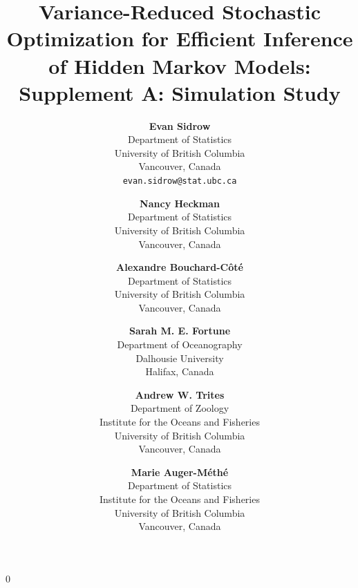 \documentclass[12pt]{article}
\newcommand{\blind}{0}
\begin{document}
\raggedbottom
%

\def\spacingset#1{\renewcommand{\baselinestretch}%
{#1}\small\normalsize} \spacingset{1}


\blind
{
    \title{Variance-Reduced Stochastic Optimization for Efficient Inference of Hidden Markov Models: Supplement A: Simulation Study}
    
    \author{
      \textbf{Evan Sidrow} \\
      Department of Statistics \\
      University of British Columbia\\
      Vancouver, Canada \\
    \texttt{evan.sidrow@stat.ubc.ca} \\
      \and
      \textbf{Nancy Heckman} \\
      Department of Statistics \\
      University of British Columbia \\
      Vancouver, Canada \\
      \and
      \textbf{Alexandre Bouchard-C\^ot\'e} \\
      Department of Statistics \\
      University of British Columbia \\
      Vancouver, Canada \\
      \and
      \textbf{Sarah M. E. Fortune} \\
      Department of Oceanography \\
      Dalhousie University \\
      Halifax, Canada \\
      \and
      \textbf{Andrew W. Trites} \\
      Department of Zoology \\
      Institute for the Oceans and Fisheries \\
      University of British Columbia \\
      Vancouver, Canada \\
      \and
      \textbf{Marie Auger-M\'eth\'e} \\
      Department of Statistics \\
      Institute for the Oceans and Fisheries \\
      University of British Columbia \\
      Vancouver, Canada \\
    }
    \maketitle
} \fi
\end{document}
